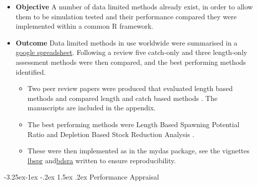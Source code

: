 \documentclass[a4paper, 10pt]{article}
\makeatletter
\newcommand{\coilin}{\textcolor{coilin}}
\renewcommand{\subsection}{\@startsection{subsection}{2}{\z@}%
 {-3.25ex\@plus -1ex \@minus -.2ex}%
 {1.5ex \@plus .2ex}%
 {\normalfont\bfseries\slshape}}
\makeatother
\begin{document}
\begin{itemize}[labelindent=\parindent,noitemsep,topsep=0pt,parsep=0pt,partopsep=0pt]
 \item \textbf{Objective} A number of data limited methods already exist, in order to allow them to be simulation tested and their performance compared they were implemented within a common R framework.    
 \item \textbf{Outcome} Data limited methods in use worldwide were summarised in a \href{https://docs.google.com/spreadsheets/d/17_qQdzDY41ZrL0yT6QtHpUR4_ydxx_xfCh4GiDqYymU/edit?usp=sharing}{google spreadsheet}. Following a review five catch-only and three length-only assessment methods were then compared, and the best performing methods identified.  
 \begin{itemize}
 \item Two peer review papers were produced that evaluated length based methods \citep{pons2019performance} and compared length and catch based methods \citep{pons2019catchlen}. The manuscripts are included in the appendix. 
 \item  The best performing methods were Length Based Spawning Potential Ratio \citep[LBSPR][]{hordyk2014novel} and Depletion Based  Stock Reduction Analysis \citep[DBSRA][]{dick2011depletion}. 
 \item These were then implemented as in the mydas package, see the vignettes \href{https://3o2y9wugzp1kfxr5hvzgzq-on.drv.tw/MyDas/tasks/4/simtest-lbspr.html}{lbspr} and\href{https://3o2y9wugzp1kfxr5hvzgzq-on.drv.tw/MyDas/tasks/4/simtest-bdsra.html}{bdsra} written to ensure reproducibility. %
 \end{itemize}
\end{itemize}

\subsection{Performance Appraisal}
 
\end{document}
